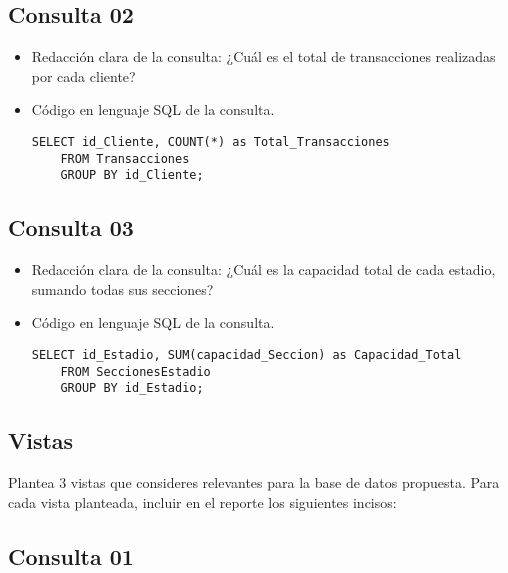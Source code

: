 \subsection*{Consulta 02}

\begin{itemize}
    \item Redacción clara de la consulta: ¿Cuál es el total de transacciones realizadas por cada cliente?
    \item Código en lenguaje SQL de la consulta.
    \begin{lstlisting}[caption={Tablas para la BdDatos}, label={lst:sql_estadios}]
    SELECT id_Cliente, COUNT(*) as Total_Transacciones
    FROM Transacciones
    GROUP BY id_Cliente;
    \end{lstlisting}    
    
\end{itemize}


\subsection*{Consulta 03}

\begin{itemize}
    \item Redacción clara de la consulta: ¿Cuál es la capacidad total de cada estadio, sumando todas sus secciones?
    \item Código en lenguaje SQL de la consulta.
    \begin{lstlisting}[caption={Tablas para la BdDatos}, label={lst:sql_estadios}]
    SELECT id_Estadio, SUM(capacidad_Seccion) as Capacidad_Total
    FROM SeccionesEstadio
    GROUP BY id_Estadio;    
    \end{lstlisting}    
\end{itemize}


\subsection{Vistas}


Plantea 3 vistas que consideres relevantes para la base de datos propuesta. Para cada vista planteada, incluir en el reporte los siguientes incisos:


\subsection*{Consulta 01}

